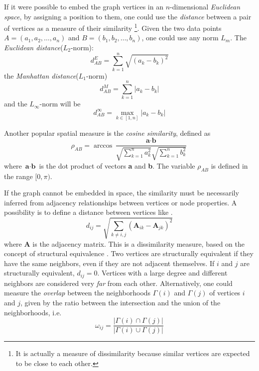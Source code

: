 If it were possible to embed the graph vertices in an $n$-dimensional \textit{Euclidean space}, by assigning a position to them, one could use the \textit{distance} between a pair of vertices as a measure of their similarity \footnote{It is actually a measure of dissimilarity because similar vertices are expected to be close to each other.}. Given the two data points $A = (a_1, a_2, \dots, a_n)$ and $B = (b_1, b_2, \dots , b_n)$, one could use any norm $L_m$.\newline \newline
The \textit{Euclidean distance}($L_2$-norm):
\begin{equation}
d_{AB}^E = \sum_{k=1}^{n} \sqrt{(a_k - b_k)^2}
\end{equation}
the \textit{Manhattan distance}($L_1$-norm)
\begin{equation}
d_{AB}^M = \sum_{k=1}^{n} \vert a_k - b_k \vert
\end{equation}
and the $L_\infty$-norm will be
\begin{equation}
d_{AB}^\infty = \underset{k \in [1,n]}{\max} \vert a_k - b_k \vert
\end{equation}

Another popular spatial measure is the \textit{cosine similarity}, defined as
\begin{equation}\label{eq:cosine_similarity}
\rho_{AB} = \arccos \dfrac{\textbf{a} \cdot \textbf{b}}{\sqrt{\sum\limits_{k=1}^{n}{a_k^2}} \sqrt{\sum\limits_{k=1}^{n}{b_k^2}}}
\end{equation}
where $\textbf{a}\cdot\textbf{b}$ is the dot product of vectors \textbf{a} and \textbf{b}. The variable $\rho_{AB}$ is defined in the range $[0,\pi)$.

If the graph cannot be embedded in space, the similarity must be necessarily inferred from adjacency relationships between vertices or node properties. A possibility is to define a distance between vertices like \cite{ref-8, ref-9}.
\begin{equation}
d_{ij} = \sqrt{\sum_{k \neq {i,j}} (\textbf{A}_{ik} - \textbf{A}_{jk})^2}
\end{equation}
where \textbf{A} is the adjacency matrix. This is a dissimilarity measure, based on the concept of structural equivalence \cite{ref-10}. Two vertices are structurally equivalent if they have the same neighbors, even if they are not adjacent themselves. If $i$ and $j$ are structurally equivalent, $d_{ij} = 0$. Vertices with a large degree and different neighbors are considered very \textit{far} from each other. Alternatively, one could measure the \textit{overlap} between the neighborhoods $\varGamma(i)$ and $\varGamma(j)$ of vertices $i$ and $j$, given by the ratio between the intersection and the union of the neighborhoods, i.e.
\begin{equation}\label{eq:neihborhood-overlap}
\omega_{ij} = \dfrac{\vert \varGamma(i) \cap \varGamma(j) \vert}{\vert \varGamma(i) \cup \varGamma(j) \vert}
\end{equation}


